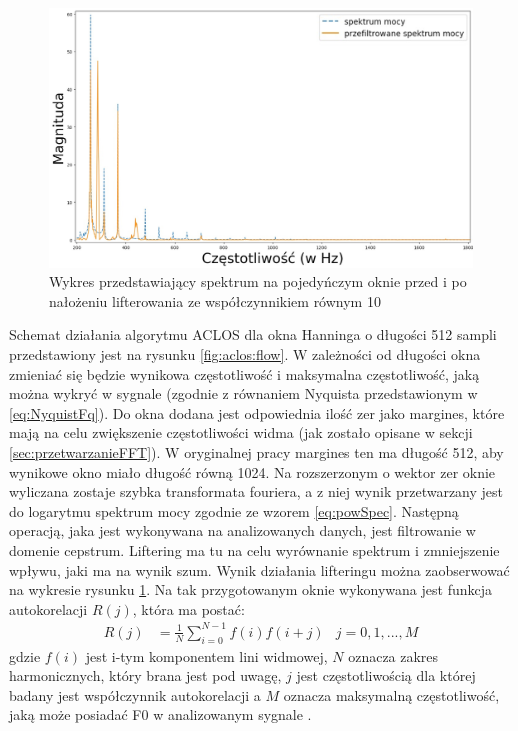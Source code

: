 \documentclass[12pt,a4paper,twoside]{mwart}
\begin{document}
\begin{figure}[h]
  \begin{center}
    \includegraphics[scale=0.33]{images/ACLOS/data_lifter_cropped.jpg} 
    \caption{Wykres przedstawiający spektrum na pojedyńczym oknie przed i po nałożeniu lifterowania ze współczynnikiem równym 10} 
    \label{fig:aclos:lifter}
  \end{center}
\end{figure}

Schemat działania algorytmu ACLOS dla okna Hanninga o długości 512 sampli przedstawiony jest na rysunku \ref{fig:aclos:flow}. W zależności od długości okna zmieniać się będzie wynikowa częstotliwość i maksymalna częstotliwość, jaką można wykryć w sygnale (zgodnie z równaniem Nyquista przedstawionym w \ref{eq:NyquistFq}). Do okna dodana jest odpowiednia ilość zer jako margines, które mają na celu zwiększenie częstotliwości widma (jak zostało opisane w sekcji \ref{sec:przetwarzanieFFT}). W oryginalnej pracy margines ten ma długość 512, aby wynikowe okno miało długość równą 1024. Na rozszerzonym o wektor zer oknie wyliczana zostaje szybka transformata fouriera, a z niej wynik przetwarzany jest do logarytmu spektrum mocy zgodnie ze wzorem \ref{eq:powSpec}. Następną operacją, jaka jest wykonywana na analizowanych danych, jest filtrowanie w domenie cepstrum. Liftering ma tu na celu wyrównanie spektrum i zmniejszenie wpływu, jaki ma na wynik szum. Wynik działania lifteringu można zaobserwować na wykresie rysunku \ref{fig:aclos:lifter}. Na tak przygotowanym oknie wykonywana jest funkcja autokorelacji $R(j)$, która ma postać:
\begin{align}\label{eq:Aclos:ACf}
  R(j)& = \frac{1}{N}\sum_{i=0}^{N-1}f(i)f(i + j)&
  j = 0, 1, ..., M
\end{align}
gdzie $f(i)$ jest i-tym komponentem lini widmowej, $N$ oznacza zakres harmonicznych, który brana jest pod uwagę, $j$ jest częstotliwością dla której badany jest współczynnik autokorelacji a $M$ oznacza maksymalną częstotliwość, jaką może posiadać F0 w analizowanym sygnale 
\cite[50-51]{Transcription:Quenneville:Thesis}
.
\end{document}
